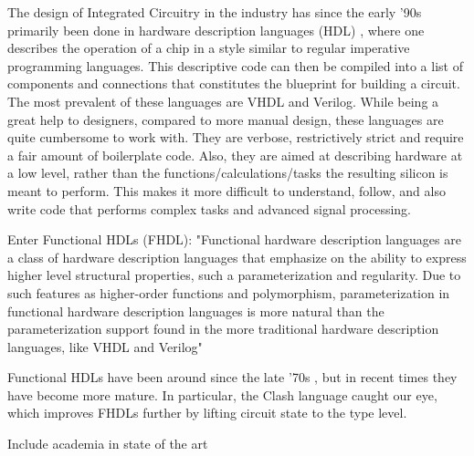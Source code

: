 The design of Integrated Circuitry in the industry has since the early '90s 
primarily been done in hardware description languages (HDL) \cite{ChenG}, 
where one describes the operation of a chip in a style similar to regular 
imperative programming languages. This descriptive code can then be compiled 
into a list of components and connections that constitutes the blueprint for 
building a circuit. The most prevalent of these languages are VHDL and 
Verilog. While being a great help to designers, compared to more manual 
design, these languages are quite cumbersome to work with. They are verbose, 
restrictively strict and require a fair amount of boilerplate code. Also, 
they are aimed at describing hardware at a low level, rather than the 
functions/calculations/tasks the resulting silicon is meant to perform. This 
makes it more difficult to understand, follow, and also write code that 
performs complex tasks and advanced signal processing.

Enter Functional HDLs (FHDL): 
"Functional hardware description languages are a class of hardware description languages that emphasize on the ability to express higher level structural properties, such a parameterization and regularity.  Due to such features as higher-order functions and polymorphism, parameterization in functional hardware description languages is more natural than the parameterization support found in the more traditional hardware description languages, like VHDL and Verilog" \cite{Baaij}

Functional HDLs have been around since the late '70s \cite{ChenG}, but in 
recent times they have become more mature. In particular, the Clash language
caught our eye, which improves FHDLs further by lifting circuit state to the 
type level.

Include academia in state of the art
